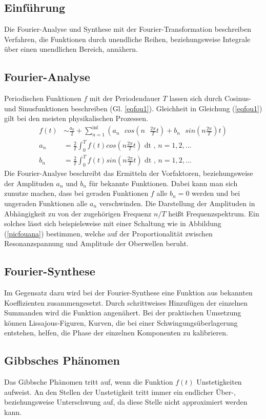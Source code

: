 \subsection{Einführung}
Die Fourier-Analyse und Synthese mit der Fourier-Transformation beschreiben Verfahren, die 
Funktionen durch unendliche Reihen, beziehungsweise Integrale über einen unendlichen Bereich,
annähern.\\
\subsection{Fourier-Analyse} 
Periodischen Funktionen $f$ mit der Periodendauer $T$ lassen sich durch Cosinus- und Sinusfunktionen
beschreiben (Gl. \ref{eqfou1}). Gleichheit in Gleichung (\ref{eqfou1}) gilt bei den meisten physikalischen Prozessen.
\begin{align}
f(t)&\sim\frac{a_0}{2} + \sum_{n=1}^\inf (a_n\text{ }cos(n\text{ }\frac{2 \pi}{T} t) + b_n\text{ }sin(n\frac{2 \pi}{T}) t) \label{eqfou1} \\
a_n&=\frac{2}{T} \int_0^T f(t) cos(n \frac{2 \pi}{T} t) \text{ dt}\text{ , } n=1,2,\dots \\
b_n&=\frac{2}{T} \int_0^T f(t) sin(n \frac{2 \pi}{T} t) \text{ dt}\text{ , } n=1,2,\dots 
\end{align}
Die Fourier-Analyse beschreibt das Ermitteln der Vorfaktoren, beziehungsweise der Amplituden $a_n$ und $b_n$ für bekannte Funktionen.
Dabei kann man sich zunutze machen, dass bei geraden Funktionen $f$ alle $b_n=0$ werden und bei
ungeraden Funktionen alle $a_n$ verschwinden. Die Darstellung der Amplituden in Abhängigkeit zu von der zugehörigen Frequenz $n/T$
heißt Frequenzspektrum. Ein solches lässt sich beispielsweise mit einer Schaltung wie in Abbildung (\ref{picfouana})
bestimmen, welche auf der Proportionalität zwischen Resonanzspannung und Amplitude der Oberwellen beruht.
\subsection{Fourier-Synthese}
Im Gegensatz dazu wird bei der Fourier-Synthese eine Funktion aus bekannten Koeffizienten zusammengesetzt.
Durch schrittweises Hinzufügen der einzelnen Summanden wird die Funktion angenähert. Bei der
praktischen Umsetzung können Lissajous-Figuren, Kurven, die bei einer Schwingungsüberlagerung entstehen, helfen, 
die Phase der einzelnen Komponenten zu kalibrieren.
\subsection{Gibbsches Phänomen}
Das Gibbsche Phänomen tritt auf, wenn die Funktion $f(t)$ Unstetigkeiten aufweist. An den Stellen
der Unstetigkeit tritt immer ein endlicher Über-, beziehungsweise Unterschwung auf, da diese Stelle
nicht approximiert werden kann.
